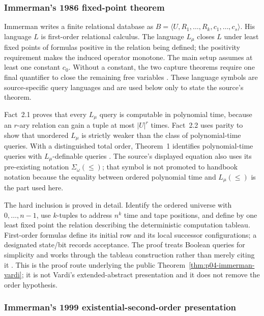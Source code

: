 \subsubsection{Immerman's 1986 fixed-point theorem}

Immerman writes a finite relational database as
\(B=\langle U,R_1,\ldots,R_k,c_1,\ldots,c_s\rangle\).  His language \(L\) is
first-order relational calculus.  The language \(L_\mu\) closes \(L\) under
least fixed points of formulas positive in the relation being defined; the
positivity requirement makes the induced operator monotone.  The main setup
assumes at least one constant \(c_0\).  Without a constant, the two capture
theorems require one final quantifier to close the remaining free variables
\cite[pp.~87--89]{Immerman1986}.  These language symbols are source-specific
query languages and are used below only to state the source's theorem.

Fact~2.1 proves that every \(L_\mu\) query is computable in polynomial time,
because an \(r\)-ary relation can gain a tuple at most \(\lvert U\rvert^r\)
times.  Fact~2.2 uses parity to show that unordered \(L_\mu\) is strictly weaker
than the class of polynomial-time queries.  With a distinguished total order,
Theorem~1 identifies polynomial-time queries with \(L_\mu\)-definable queries
\cite[pp.~89--93]{Immerman1986}.  The source's displayed equation also uses its
pre-existing notation \(\Sigma_\omega(\leq)\); that symbol is not promoted to
handbook notation because the equality between ordered polynomial time and
\(L_\mu(\leq)\) is the part used here.

The hard inclusion is proved in detail.  Identify the ordered universe with
\(0,\ldots,n-1\), use \(k\)-tuples to address \(n^k\) time and tape positions,
and define by one least fixed point the relation describing the deterministic
computation tableau.  First-order formulas define its initial row and its local
successor configurations; a designated state/bit records acceptance.  The
proof treats Boolean queries for simplicity and works through the tableau
construction rather than merely citing it \cite[pp.~90--93]{Immerman1986}.
This is the proof route underlying the public
Theorem~\ref{thm:p04-immerman-vardi}; it is not Vardi's extended-abstract
presentation and it does not remove the order hypothesis.

\subsubsection{Immerman's 1999 existential-second-order presentation}

